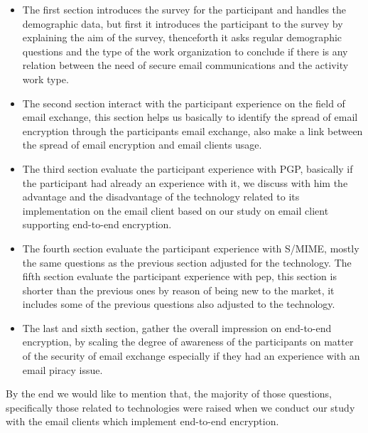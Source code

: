 \begin{itemize}
	\item The first section introduces the survey for the participant and handles the demographic data, but first it introduces the participant to the survey by explaining the aim of the survey, thenceforth it asks regular demographic questions and the type of the work organization to conclude if there is any relation between the need of secure email communications and the activity work type.
	\item The second section interact with the participant experience on the field of email exchange, this section helps us basically to identify the spread of email encryption through the participants email exchange, also make a link between the spread of email encryption and email clients usage.  
	\item The third section evaluate the participant experience with PGP, basically if the participant had already an experience with it, we discuss with him the advantage and the disadvantage of the technology related to its implementation on the email client based on our study on email client supporting end-to-end encryption.
	\item The fourth section evaluate the participant experience with S/MIME, mostly the same questions as the previous section adjusted for the technology.
	The fifth section evaluate the participant experience with pep, this section is shorter than the previous ones by reason of being new to the market, it includes some of the previous questions also adjusted to the technology.
	\item The last and sixth section, gather the overall impression on end-to-end encryption, by scaling the degree of awareness of the participants on matter of the security of email exchange especially if they had an experience with an email piracy issue.
\end{itemize}
By the end we would like to mention that, the majority of those questions, specifically those related to technologies were raised when we conduct our study with the email clients which implement end-to-end encryption.